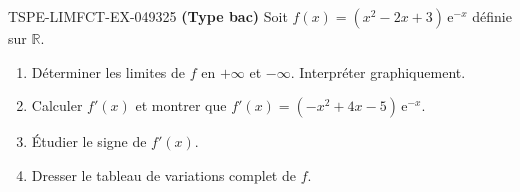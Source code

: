 \begin{exercice}{TSPE-LIMFCT-EX-049}{3}{25}
\textbf{(Type bac)} Soit $f(x) = (x^2 - 2x + 3)\,\mathrm{e}^{-x}$ définie sur $\mathbb{R}$.
\begin{enumerate}
  \item Déterminer les limites de $f$ en $+\infty$ et $-\infty$. Interpréter graphiquement.
  \item Calculer $f'(x)$ et montrer que $f'(x) = (-x^2 + 4x - 5)\,\mathrm{e}^{-x}$.
  \item Étudier le signe de $f'(x)$.
  \item Dresser le tableau de variations complet de $f$.
\end{enumerate}
\end{exercice}
